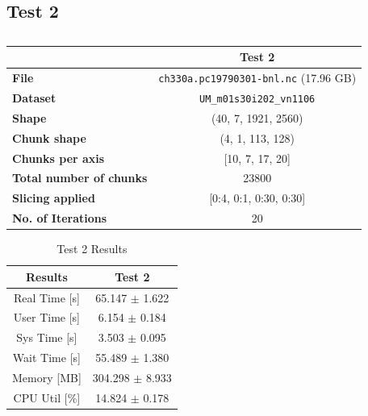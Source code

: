 \documentclass{article}
\begin{document}
\subsection{Test 2}
\begin{table}[h!] 
    \centering 
    \begin{tabular}{lc}  \hline
                                        & Test 2                                          \\ \hline
        \textbf{File}                   & \texttt{ch330a.pc19790301-bnl.nc}  (17.96  GB)  \\  
        \textbf{Dataset}                &  \texttt{UM\_m01s30i202\_vn1106}                \\ 
        \textbf{Shape}                  &  (40, 7, 1921, 2560)                            \\ 
        \textbf{Chunk shape}            &  (4, 1, 113, 128)                               \\ 
        \textbf{Chunks per axis}        &  [10, 7, 17, 20]                                \\ 
        \textbf{Total number of chunks} &    23800                                        \\ 
        \textbf{Slicing applied}        & [0:4, 0:1, 0:30, 0:30]                          \\ 
        \textbf{No. of Iterations}      &  20                                             \\  \hline
    \end{tabular} 
    \caption{} 
    \label{tab:T2_Conditions} 
\end{table}


\begin{table}[h!]
    \centering
    \begin{tabular}{cc}
        \hline
        \textbf{Results} & Test 2              \\ \hline
        Real Time [s]    & 65.147 $\pm$ 1.622  \\
        User Time [s]    & 6.154  $\pm$ 0.184  \\
        Sys Time [s]     & 3.503  $\pm$ 0.095  \\
        Wait Time [s]    & 55.489 $\pm$ 1.380  \\
        Memory [MB]      & 304.298 $\pm$ 8.933 \\
        CPU Util [\%]    & 14.824 $\pm$ 0.178  \\
        \hline
    \end{tabular}
    \caption{Test 2 Results}
    \label{tab:T2_Results}
\end{table}
\end{document}
